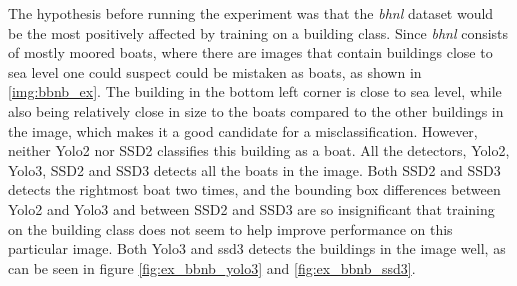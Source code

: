 The hypothesis before running the experiment was that the \textit{bhnl} dataset would be the most positively affected by training on a building class. Since \textit{bhnl} consists of mostly moored boats, where there are images that contain buildings close to sea level one could suspect could be mistaken as boats, as shown in \ref{img:bbnb_ex}. The building in the bottom left corner is close to sea level, while also being relatively close in size to the boats compared to the other buildings in the image, which makes it a good candidate for a misclassification. However, neither Yolo2 nor SSD2 classifies this building as a boat. All the detectors, Yolo2, Yolo3, SSD2 and SSD3 detects all the boats in the image. Both SSD2 and SSD3 detects the rightmost boat two times, and the bounding box differences between Yolo2 and Yolo3 and between SSD2 and SSD3 are so insignificant that training on the building class does not seem to help improve performance on this particular image. Both Yolo3 and ssd3 detects the buildings in the image well, as can be seen in figure \ref{fig:ex_bbnb_yolo3} and \ref{fig:ex_bbnb_ssd3}.


